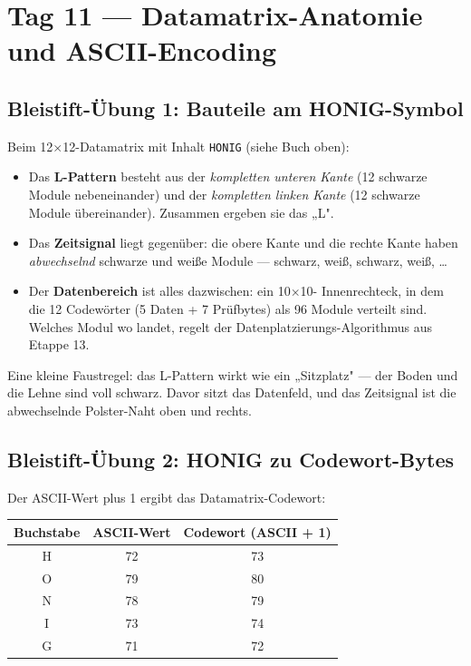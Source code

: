 \section*{Tag 11 — Datamatrix-Anatomie und ASCII-Encoding}

\subsection*{Bleistift-Übung 1: Bauteile am HONIG-Symbol}

Beim 12$\times$12-Datamatrix mit Inhalt \texttt{HONIG} (siehe Buch
oben):

\begin{itemize}
\item Das \textbf{L-Pattern} besteht aus der \emph{kompletten unteren
  Kante} (12 schwarze Module nebeneinander) und der \emph{kompletten
  linken Kante} (12 schwarze Module übereinander). Zusammen ergeben
  sie das „L".
\item Das \textbf{Zeitsignal} liegt gegenüber: die obere Kante und
  die rechte Kante haben \emph{abwechselnd} schwarze und weiße
  Module — schwarz, weiß, schwarz, weiß, \dots
\item Der \textbf{Datenbereich} ist alles dazwischen: ein 10$\times$10-
  Innenrechteck, in dem die 12 Codewörter (5 Daten + 7 Prüfbytes)
  als 96 Module verteilt sind. Welches Modul wo landet, regelt
  der Datenplatzierungs-Algorithmus aus Etappe 13.
\end{itemize}

Eine kleine Faustregel: das L-Pattern wirkt wie ein „Sitzplatz" —
der Boden und die Lehne sind voll schwarz. Davor sitzt das Datenfeld,
und das Zeitsignal ist die abwechselnde Polster-Naht oben und rechts.

\subsection*{Bleistift-Übung 2: HONIG zu Codewort-Bytes}

Der ASCII-Wert plus 1 ergibt das Datamatrix-Codewort:

\begin{center}
\small
\begin{tabular}{c c c}
\toprule
Buchstabe & ASCII-Wert & Codewort (ASCII + 1) \\
\midrule
H & 72 & 73 \\
O & 79 & 80 \\
N & 78 & 79 \\
I & 73 & 74 \\
G & 71 & 72 \\
\bottomrule
\end{tabular}
\end{center}

